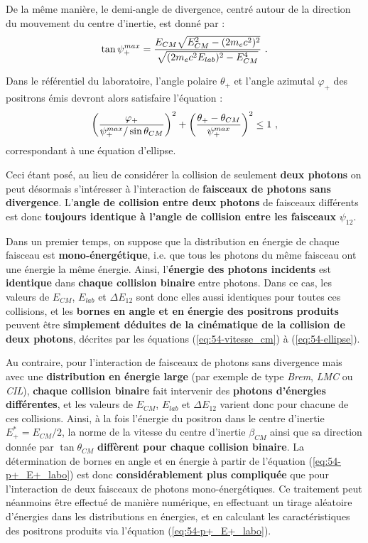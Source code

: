 \begin{refsection}
De la même manière, le demi-angle de divergence, centré autour de la direction du mouvement du centre d'inertie, est donné par :
\begin{equation}
    \tan \psi_+^{max} = \dfrac{E_{CM} \sqrt{E_{CM}^2 - (2 m_e c^2)^2}}{\sqrt{(2 m_e c^2 E_{lab})^2 - E_{CM}^4}} ~ \rm .
    \label{eq:54-psi+max}
\end{equation}

Dans le référentiel du laboratoire, l'angle polaire $\theta_+$ et l'angle azimutal $\varphi_+$ des positrons émis devront alors satisfaire l'équation :
\begin{equation}
    \left( \dfrac{\varphi_+}{\psi_+^{max}/\sin{\theta_{CM}}} \right)^2 + \left( \dfrac{\theta_+ - \theta_{CM}}{\psi_+^{max}}\right)^2 \leq 1 ~ \rm ,
    \label{eq:54-ellipse}
\end{equation}
correspondant à une équation d'ellipse.


Ceci étant posé, au lieu de considérer la collision de seulement \textbf{deux photons} on peut désormais s'intéresser à l'interaction de \textbf{faisceaux de photons sans divergence}. L'\textbf{angle de collision entre deux photons} de faisceaux différents est donc \textbf{toujours identique à l'angle de collision entre les faisceaux} $\psi_{12}$. 

Dans un premier temps, on suppose que la distribution en énergie de chaque faisceau est \textbf{mono-énergétique}, i.e. que tous les photons du même faisceau ont une énergie la même énergie. Ainsi, l'\textbf{énergie des photons incidents} est \textbf{identique} dans \textbf{chaque collision binaire} entre photons. Dans ce cas, les valeurs de $E_{CM}$, $E_{lab}$ et $\Delta E_{12}$ sont donc elles aussi identiques pour toutes ces collisions, et les \textbf{bornes en angle et en énergie des positrons produits} peuvent être \textbf{simplement déduites de la cinématique de la collision de deux photons}, décrites par les équations (\ref{eq:54-vitesse_cm}) à (\ref{eq:54-ellipse}).

Au contraire, pour l'interaction de faisceaux de photons sans divergence mais avec une \textbf{distribution en énergie large} (par exemple de type \textit{Brem}, \textit{LMC} ou \textit{CIL}), \textbf{chaque collision binaire} fait intervenir des \textbf{photons d'énergies différentes}, et les valeurs de $E_{CM}$, $E_{lab}$ et $\Delta E_{12}$ varient donc pour chacune de ces collisions. Ainsi, à la fois l'énergie du positron dans le centre d'inertie $E_+^*=E_{CM}/2$, la norme de la vitesse du centre d'inertie $\beta_{CM}$ ainsi que sa direction donnée par $\tan \theta_{CM}$ \textbf{diffèrent pour chaque collision binaire}. 
La détermination de bornes en angle et en énergie à partir de l'équation (\ref{eq:54-p+_E+_labo}) est donc \textbf{considérablement plus compliquée} que pour l'interaction de deux faisceaux de photons mono-énergétiques. Ce traitement peut néanmoins être effectué de manière numérique, en effectuant un tirage aléatoire d'énergies dans les distributions en énergies, et en calculant les caractéristiques des positrons produits via l'équation (\ref{eq:54-p+_E+_labo}).



\end{refsection}
